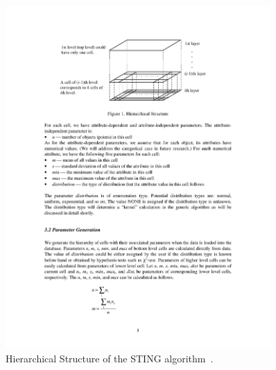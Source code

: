 \begin{figure}[h]
  \begin{center}
    \includegraphics[width=0.9\textwidth]{figures/clustering_sting.pdf}
    \caption{Hierarchical Structure of the STING algorithm~\cite[p 5]{Wang97sting}.}
    \label{fig:clustering-sting}
  \end{center}
\end{figure}




















